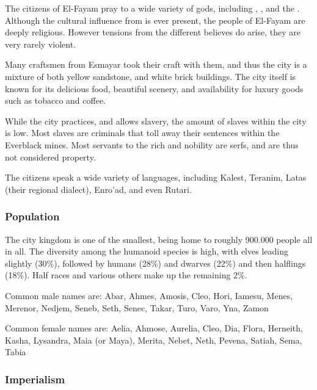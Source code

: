 The citizens of El-Fayam pray to a wide variety of gods, including
, ,  and the
. Although the cultural influence from  is ever present, the people of El-Fayam are deeply
religious. However tensions from the different believes do arise, they are
very rarely violent.

Many craftsmen from Esmayar took their craft with them, and thus the city is a
mixture of both yellow sandstone, and white brick buildings. The city itself
is known for its delicious food, beautiful scenery, and availability for
luxury goods such as tobacco and coffee.

While the city practices, and allows slavery, the amount of slaves within the
city is low. Most slaves are criminals that toll away their sentences within
the Everblack mines. Most servants to the rich and nobility are serfs, and are
thus not considered property.

The citizens speak a wide variety of languages, including Kalest, Teranim,
Latas (their regional dialect), Enro'ad, and even Rutari.

\subsubsection{Population}

The city kingdom is one of the smallest, being home to roughly 900.000
people all in all. The diversity among the humanoid species is high, with
elves leading slightly (30\%), followed by humans (28\%) and dwarves (22\%)
and then halflings (18\%). Half races and various others make up the remaining
2\%.

Common male names are: Abar, Ahmes, Amosis, Cleo, Hori, Iamesu, Menes,
Merenor, Nedjem, Seneb, Seth, Senec, Takar, Turo, Varo, Yna, Zamon

Common female names are: Aelia, Ahmose, Aurelia, Cleo, Dia, Flora, Herneith,
Kasha, Lysandra, Maia (or Maya), Merita, Nebet, Neth, Pevena, Satiah, Sema,
Tabia

\subsubsection{Imperialism}

